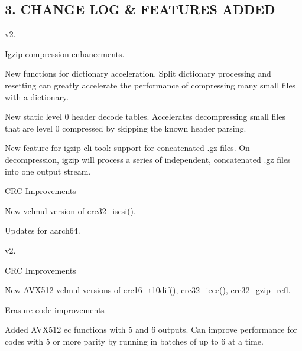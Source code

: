 \subsection*{3. C\-H\-A\-N\-G\-E L\-O\-G \& F\-E\-A\-T\-U\-R\-E\-S A\-D\-D\-E\-D }

v2.


\begin{DoxyItemize}
\item Igzip compression enhancements.
\begin{DoxyItemize}
\item New functions for dictionary acceleration. Split dictionary processing and resetting can greatly accelerate the performance of compressing many small files with a dictionary.
\item New static level 0 header decode tables. Accelerates decompressing small files that are level 0 compressed by skipping the known header parsing.
\item New feature for igzip cli tool\-: support for concatenated .gz files. On decompression, igzip will process a series of independent, concatenated .gz files into one output stream.
\end{DoxyItemize}
\item C\-R\-C Improvements
\begin{DoxyItemize}
\item New vclmul version of \hyperlink{crc_8h_abdf5fc84c01b815d8416028020e04cdd}{crc32\-\_\-iscsi()}.
\item Updates for aarch64.
\end{DoxyItemize}
\end{DoxyItemize}

v2.


\begin{DoxyItemize}
\item C\-R\-C Improvements
\begin{DoxyItemize}
\item New A\-V\-X512 vclmul versions of \hyperlink{crc_8h_a215110f2c12cccba0595f8e50f8775bb}{crc16\-\_\-t10dif()}, \hyperlink{crc_8h_a48a9c9192fb63c267bd17eaaad3ed312}{crc32\-\_\-ieee()}, crc32\-\_\-gzip\-\_\-refl.
\end{DoxyItemize}
\item Erasure code improvements
\begin{DoxyItemize}
\item Added A\-V\-X512 ec functions with 5 and 6 outputs. Can improve performance for codes with 5 or more parity by running in batches of up to 6 at a time.
\end{DoxyItemize}
\end{DoxyItemize}

